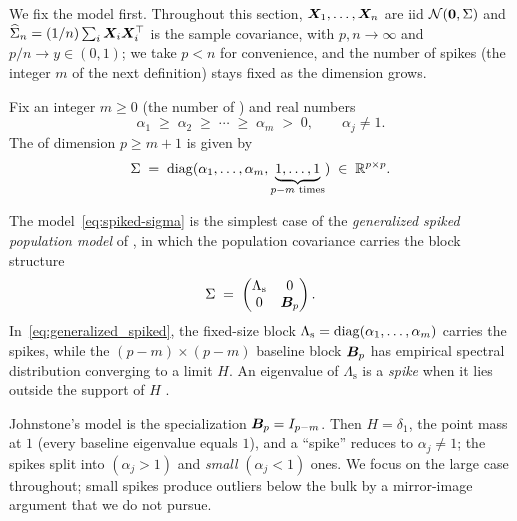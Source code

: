 We fix the model first. Throughout this section, \(\bm{X}_1, \dots, \bm{X}_n\) are iid \(\mathcal{N}(\bm{0}, \Sigma)\) and \(\widehat{\Sigma}_n = (1/n)\sum_i \bm{X}_i \bm{X}_i^{\top}\) is the sample covariance, with \(p, n \to \infty\) and \(p/n \to y \in (0, 1)\); we take \(p < n\) for convenience, and the number of spikes (the integer \(m\) of the next definition) stays fixed as the dimension grows.


\begin{definition}\label{def:spiked-model}
Fix an integer \(m \ge 0\) (the number of ) and real numbers
\[
  \alpha_1 \;\ge\; \alpha_2 \;\ge\; \cdots \;\ge\; \alpha_m \;>\; 0,\qquad \alpha_j \ne 1.
\]
The  of dimension \(p \ge m + 1\) is given by 
\begin{equation}
  \Sigma \;=\; \operatorname{diag}(\alpha_1, \dots, \alpha_m, \underbrace{1, \dots, 1}_{p - m \text{ times}}) \;\in\; \mathbb{R}^{p \times p}.
  \label{eq:spiked-sigma}
\end{equation}
\end{definition}

The model~\eqref{eq:spiked-sigma} is the simplest case of the \emph{generalized spiked population model} of \citet[][\S~11.2]{YaoZhengBai2015}, in which the population covariance carries the block structure
\begin{equation}\label{eq:generalized_spiked}
  \Sigma \;=\; \begin{pmatrix} \Lambda_{\mathrm{s}} & 0 \\ 0 & \bm{B}_p \end{pmatrix}.
\end{equation}
In~\eqref{eq:generalized_spiked}, the fixed-size block \(\Lambda_{\mathrm{s}} = \operatorname{diag}(\alpha_1, \dots, \alpha_m)\) carries the spikes, while the \((p - m) \times (p - m)\) baseline block \(\bm{B}_p\) has empirical spectral distribution converging to a limit \(H\). An eigenvalue of \(\Lambda_{\mathrm{s}}\) is a \emph{spike} when it lies outside the support of \(H\) \citep[][Def.~11.2]{YaoZhengBai2015}.

\begin{example}\label{ex:johnstone-special}
Johnstone's model \citep[\S~11.2.1]{YaoZhengBai2015} is the specialization \(\bm{B}_p = I_{p - m}\). Then \(H = \delta_1\), the point mass at \(1\) (every baseline eigenvalue equals \(1\)), and a ``spike'' reduces to \(\alpha_j \ne 1\); the spikes split into  \((\alpha_j > 1)\) and \emph{small} \((\alpha_j < 1)\) ones. We focus on the large case throughout; small spikes produce outliers below the bulk by a mirror-image argument that we do not pursue.
\end{example}

